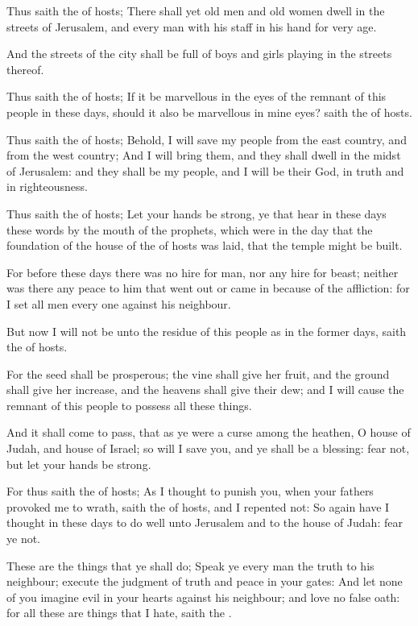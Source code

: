 \Verse Thus saith the \LORD of hosts; There shall yet old men and old women dwell in the streets of Jerusalem, and every man with his staff in his hand for very age.

\Verse And the streets of the city shall be full of boys and girls playing in the streets thereof.

\Verse Thus saith the \LORD of hosts; If it be marvellous in the eyes of the remnant of this people in these days, should it also be marvellous in mine eyes? saith the \LORD of hosts.

\Verse Thus saith the \LORD of hosts; Behold, I will save my people from the east country, and from the west country; \Verse And I will bring them, and they shall dwell in the midst of Jerusalem: and they shall be my people, and I will be their God, in truth and in righteousness.

\Verse Thus saith the \LORD of hosts; Let your hands be strong, ye that hear in these days these words by the mouth of the prophets, which were in the day that the foundation of the house of the \LORD of hosts was laid, that the temple might be built.

\Verse For before these days there was no hire for man, nor any hire for beast; neither was there any peace to him that went out or came in because of the affliction: for I set all men every one against his neighbour.

\Verse But now I will not be unto the residue of this people as in the former days, saith the \LORD of hosts.

\Verse For the seed shall be prosperous; the vine shall give her fruit, and the ground shall give her increase, and the heavens shall give their dew; and I will cause the remnant of this people to possess all these things.

\Verse And it shall come to pass, that as ye were a curse among the heathen, O house of Judah, and house of Israel; so will I save you, and ye shall be a blessing: fear not, but let your hands be strong.

\Verse For thus saith the \LORD of hosts; As I thought to punish you, when your fathers provoked me to wrath, saith the \LORD of hosts, and I repented not: \Verse So again have I thought in these days to do well unto Jerusalem and to the house of Judah: fear ye not.

\Verse These are the things that ye shall do; Speak ye every man the truth to his neighbour; execute the judgment of truth and peace in your gates: \Verse And let none of you imagine evil in your hearts against his neighbour; and love no false oath: for all these are things that I hate, saith the \LORD.

